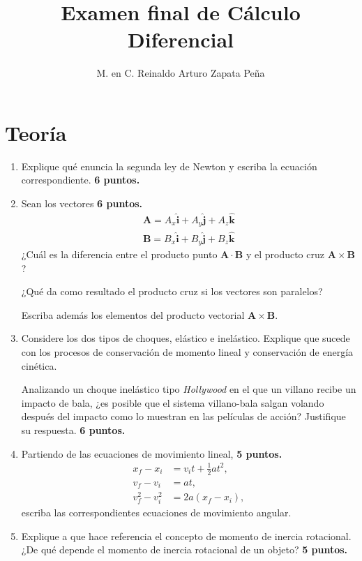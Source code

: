 \documentclass{article}
\title{Examen final de Cálculo Diferencial}
\author{M. en C. Reinaldo Arturo Zapata Peña}
\begin{document}


\section{Teoría} %
\label{sec:teoria}

\begin{enumerate}

\item Explique qu\'e enuncia la segunda ley de Newton y escriba la ecuaci\'on
correspondiente.
\hfill \textbf{6 puntos.}

\item Sean los vectores 
\hfill \textbf{6 puntos.}
\begin{align}
\mathbf{A} = A_{x}\mathbf{\hat{i}} +
A_{y}\mathbf{\hat{j}} + A_{z}\mathbf{\hat{k}} \\
\mathbf{B} = B_{x}\mathbf{\hat{i}} + B_{y}\mathbf{\hat{j}} +
B_{z}\mathbf{\hat{k}}
\end{align}
¿Cuál es la diferencia entre el producto punto $\mathbf{A} \cdot \mathbf{B}$ y
el producto cruz $\mathbf{A} \times \mathbf{B}$? 

¿Qué da como resultado el producto cruz si los vectores son paralelos? 

Escriba además los elementos del producto vectorial $\mathbf{A}\times
\mathbf{B}$.

\item Considere los dos tipos de choques, elástico e inelástico. Explique que
sucede con los procesos de conservación de momento lineal y conservación de
energía cinética. 

Analizando un choque inelástico tipo \emph{Hollywood} en el que un villano
recibe un impacto de bala, ¿es posible que el sistema villano-bala salgan
volando después del impacto como lo muestran en las películas de acción?
Justifique su respuesta.
\hfill \textbf{6 puntos.}

\item Partiendo de las ecuaciones de movimiento lineal, 
\hfill \textbf{5 puntos.}
\begin{align}
x_{f} - x_{i} &= v_{i}t + \frac{1}{2}at^{2}, \\
v_{f} - v_{i} &= at, \\
v_{f}^{2} - v_{i}^{2} &= 2a(x_{f} - x_{i}),
\end{align}
escriba las correspondientes ecuaciones de movimiento angular.

\item Explique a que hace referencia el concepto de momento de inercia
rotacional. ¿De qué depende el momento de inercia rotacional de un objeto?
\hfill \textbf{5 puntos.}


\end{enumerate}
\end{document}
